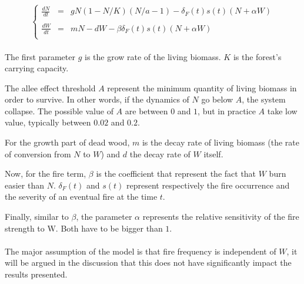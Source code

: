 \documentclass{article}
\begin{document}
\paragraph{}

\[
\left\lbrace
\begin{array}{rcl}
\frac{dN}{dt} & = & gN(1-N/K)(N/a-1) - \delta_F(t)s(t)(N+\alpha W) \\
\\
\frac{dW}{dt} & = & mN -dW - \beta\delta_F(t)s(t)(N+\alpha W) \\
\end{array}
\right.
\]

\paragraph{} %
The first parameter $g$ is the grow rate of the living biomass. $K$ is the forest's carrying capacity. 

The allee effect threshold $A$ represent the minimum quantity of living biomass in order to survive. In other words, if the dynamics of $N$ go below $A$, the system collapse. The possible value of $A$ are between $0$ and $1$, but in practice $A$ take low value, typically between $0.02$ and $0.2$.

For the growth part of dead wood, $m$ is the decay rate of living biomass (the rate of conversion from $N$ to $W$) and $d$ the decay rate of $W$ itself.

Now, for the fire term, $\beta$ is the coefficient that represent the fact that $W$ burn easier than $N$. $\delta_F(t)$ and $s(t)$ represent respectively the fire occurrence and the severity of an eventual fire at the time $t$. 

Finally, similar to $\beta$, the parameter $\alpha$ represents the relative sensitivity of the fire strength to W. Both have to be bigger than $1$.




\paragraph{} %
The major assumption of the model is that fire frequency is independent of $W$, it will be argued in the discussion \todo{} that this does not have significantly impact the results presented.
\end{document}
